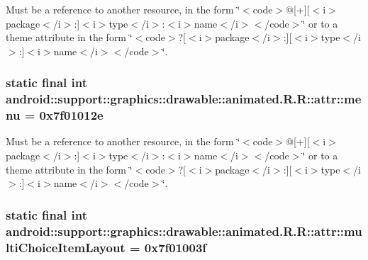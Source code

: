 Must be a reference to another resource, in the form \char`\"{}$<$code$>$@\mbox{[}+\mbox{]}\mbox{[}$<$i$>$package$<$/i$>$:\mbox{]}$<$i$>$type$<$/i$>$:$<$i$>$name$<$/i$>$$<$/code$>$\char`\"{} or to a theme attribute in the form \char`\"{}$<$code$>$?\mbox{[}$<$i$>$package$<$/i$>$:\mbox{]}\mbox{[}$<$i$>$type$<$/i$>$:\mbox{]}$<$i$>$name$<$/i$>$$<$/code$>$\char`\"{}. \hypertarget{classandroid_1_1support_1_1graphics_1_1drawable_1_1animated_1_1_r_1_1attr_e535347b070dee5c40adc1be3daa15cc}{
\subsubsection[{menu}]{\setlength{\rightskip}{0pt plus 5cm}static final int android::support::graphics::drawable::animated.R.R::attr::menu = 0x7f01012e}}
\label{classandroid_1_1support_1_1graphics_1_1drawable_1_1animated_1_1_r_1_1attr_e535347b070dee5c40adc1be3daa15cc}


Must be a reference to another resource, in the form \char`\"{}$<$code$>$@\mbox{[}+\mbox{]}\mbox{[}$<$i$>$package$<$/i$>$:\mbox{]}$<$i$>$type$<$/i$>$:$<$i$>$name$<$/i$>$$<$/code$>$\char`\"{} or to a theme attribute in the form \char`\"{}$<$code$>$?\mbox{[}$<$i$>$package$<$/i$>$:\mbox{]}\mbox{[}$<$i$>$type$<$/i$>$:\mbox{]}$<$i$>$name$<$/i$>$$<$/code$>$\char`\"{}. \hypertarget{classandroid_1_1support_1_1graphics_1_1drawable_1_1animated_1_1_r_1_1attr_912897bfce4f8d3e72fabcd24a8f7198}{
\subsubsection[{multiChoiceItemLayout}]{\setlength{\rightskip}{0pt plus 5cm}static final int android::support::graphics::drawable::animated.R.R::attr::multiChoiceItemLayout = 0x7f01003f}}
\label{classandroid_1_1support_1_1graphics_1_1drawable_1_1animated_1_1_r_1_1attr_912897bfce4f8d3e72fabcd24a8f7198}


